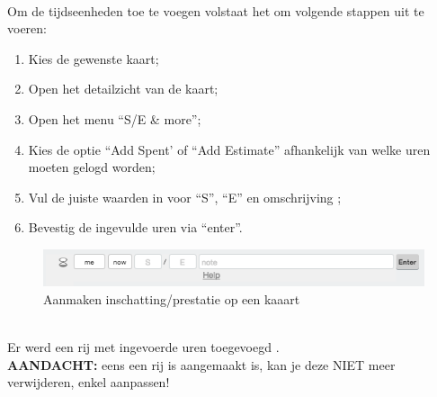 
\\
Om de tijdseenheden toe te voegen volstaat het om volgende stappen uit te voeren:
\begin{enumerate}[nolistsep]
	\item Kies de gewenste kaart;
	\item Open het detailzicht van de kaart;
	\item Open het menu ``S/E \& more'';
	\item Kies de optie ``Add Spent' of ``Add Estimate'' afhankelijk van welke uren moeten gelogd worden;
	\item Vul de juiste waarden in voor ``S'', ``E'' en omschrijving ;
	\item Bevestig de ingevulde uren via ``enter''.
\end{enumerate}

\begin{figure}[H]
	\centering
	\includegraphics[scale=0.5]{./afbeeldingen/aanmaken_prestatie.png}
	\caption{Aanmaken inschatting/prestatie op een kaaart}
	\label{fig:aanmaken_prestatie}	
\end{figure} 

\noindent
\\Er werd een rij met ingevoerde uren toegevoegd .
\\ \textbf{AANDACHT:} eens een rij is aangemaakt is, kan je deze NIET meer verwijderen, enkel aanpassen!

